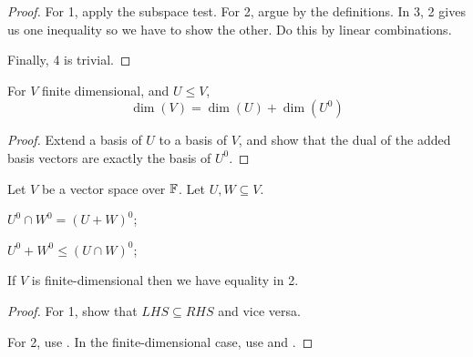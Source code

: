 \documentclass[../Main.tex]{subfiles}
\begin{document}
\begin{proof}
    For 1, apply the subspace test. For 2, argue by the definitions. In 3, 2 gives us one inequality so we have to show the other. Do this by linear combinations.
    
    Finally, 4 is trivial.
\end{proof}
\begin{proposition}
    For $V$ finite dimensional, and $U \leq V$,
    \begin{equation*}
        \dim(V) = \dim(U) + \dim(U^0)
    \end{equation*}
    \label{propDimAnnih}
\end{proposition}
\begin{proof}
    Extend a basis of $U$ to a basis of $V$, and show that the dual of the added basis vectors are exactly the basis of $U^0$.
\end{proof}
\begin{propositions}{
        Let $V$ be a vector space over $\mathbb{F}$. Let $U, W \subseteq V$.
        \label{propsAnnihSums}
    }
    \item $U^0 \cap W^0 = (U + W)^0$;
    \item $U^0 + W^0 \leq (U \cap W)^0$;
    \item If $V$ is finite-dimensional then we have equality in 2.
\end{propositions}
\begin{proof}
    For 1, show that $LHS \subseteq RHS$ and vice versa.

    For 2, use . In the finite-dimensional case, use  and .
\end{proof}
\end{document}
